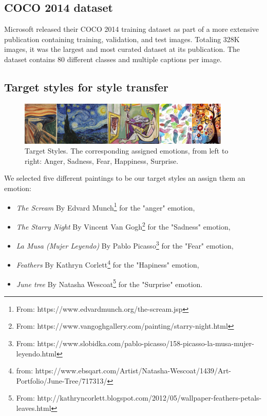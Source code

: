 \subsection{COCO 2014 dataset}

Microsoft released their COCO 2014 training dataset as part of a more extensive publication containing training, validation, and test images. Totaling 328K images, it was the largest and most curated dataset at its publication. The dataset contains 80 different classes and multiple captions per image. 


\subsection{Target styles for style transfer}


\begin{figure}[h]
  \centering
  \includegraphics[width = 0.9\textwidth]{resources/target_styles.png}
  \caption{Target Styles. The corresponding assigned emotions, from left to right: Anger, Sadness, Fear, Happiness, Surprise.}
  \label{fig:target_styles}
\end{figure}

We selected five different paintings to be our target styles an assign them an emotion:
         \begin{itemize}
          \item \emph{The Scream} By Edvard Munch\footnote{From: https://www.edvardmunch.org/the-scream.jsp}  for the "anger" emotion, 
          \item \emph{The Starry Night} By Vincent Van Gogh\footnote{From: https://www.vangoghgallery.com/painting/starry-night.html} for the "Sadness" emotion,
          \item \emph{La Musa (Mujer Leyendo)} By Pablo Picasso\footnote{From: https://www.slobidka.com/pablo-picasso/158-picasso-la-musa-mujer-leyendo.html} for the "Fear" emotion,
          \item \emph{Feathers} By Kathryn Corlett\footnote{from: https://www.ebsqart.com/Artist/Natasha-Wescoat/1439/Art-Portfolio/June-Tree/717313/} for the "Hapiness" emotion,
          \item \emph{June tree} By Natasha Wescoat\footnote{From: http://kathryncorlett.blogspot.com/2012/05/wallpaper-feathers-petals-leaves.html} for the "Surprise" emotion.
\end{itemize}

